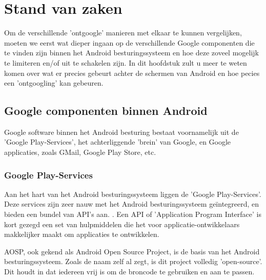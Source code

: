 \chapter{Stand van zaken}
\label{ch:stand-van-zaken}



Om de verschillende 'ontgoogle' manieren met elkaar te kunnen vergelijken, moeten we eerst wat dieper ingaan op de verschillende Google componenten die te vinden zijn binnen het Android besturingssysteem en hoe deze zoveel mogelijk te limiteren en/of uit te schakelen zijn. In dit hoofdstuk zult u meer te weten komen over wat er precies gebeurt achter de schermen van Android en hoe pecies een 'ontgoogling' kan gebeuren.

\section{Google componenten binnen Android}
Google software binnen het Android besturing bestaat voornamelijk uit de 'Google Play-Services', het achterliggende 'brein' van Google, en Google applicaties, zoals GMail, Google Play Store, etc.

\subsection{Google Play-Services}

Aan het hart van het Android besturingssysteem liggen de 'Google Play-Services'. Deze services zijn zeer nauw met het Android besturingssysteem geïntegreerd, en bieden een bundel van API's aan. \autocite{marshall_google-play-services}. Een API of 'Application Program Interface' is kort gezegd een set van hulpmiddelen die het voor applicatie-ontwikkelaars makkelijker maakt om applicaties te ontwikkelen. \autocite{beal_api}

AOSP, ook gekend als Android Open Source Project, is de basis van het Android besturingssysteem. Zoals de naam zelf al zegt, is dit project volledig 'open-source'. Dit houdt in dat iedereen vrij is om de broncode te gebruiken en aan te passen. 


